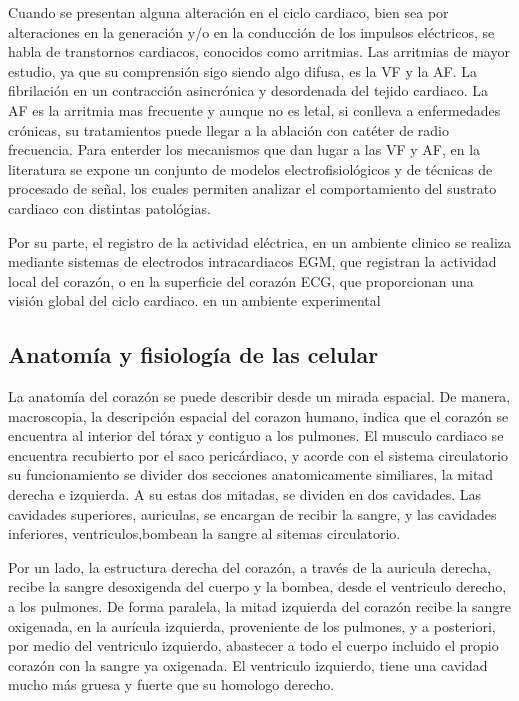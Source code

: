 Cuando se presentan alguna alteración en el ciclo cardiaco, bien sea por
alteraciones en la generación y/o en la conducción de los impulsos eléctricos,
se habla de transtornos cardiacos, conocidos como arritmias. Las arritmias de
mayor estudio, ya que su comprensión sigo siendo algo difusa, es la \acf{VF} y
la \acf{AF}. La fibrilación en un contracción asincrónica y desordenada del
tejido cardiaco. La \ac{AF} es la arritmia mas frecuente y aunque no es letal,
si conlleva a enfermedades crónicas, su tratamientos puede llegar a la ablación
con catéter de radio frecuencia.  Para enterder los mecanismos que dan lugar
a las \ac{VF} y \ac{AF}, en la literatura se expone un conjunto de modelos
electrofisiológicos y de técnicas de procesado de señal, los cuales permiten
analizar el comportamiento del sustrato cardiaco con distintas patológias.


Por su parte, el registro de la actividad eléctrica, en un ambiente clinico se
realiza mediante sistemas de electrodos intracardiacos \ac{EGM}, que registran
la actividad local del corazón, o en la superficie del corazón \ac{ECG}, que
proporcionan una visión global del ciclo cardiaco. en un ambiente experimental




\subsection{Anatomía y fisiología de las celular}

La anatomía del corazón se puede describir desde un  mirada espacial. De manera,
macroscopia, la descripción espacial del corazon humano, indica que el corazón
se encuentra al interior del tórax y contiguo a los pulmones. El musculo
cardiaco se encuentra recubierto por el saco pericárdiaco, y acorde con el
sistema circulatorio su funcionamiento se divider dos secciones anatomicamente similiares, la mitad
derecha e izquierda. A su estas dos mitadas, se dividen en dos cavidades. Las
cavidades superiores, auriculas, se encargan de recibir la sangre, y las
cavidades  inferiores, ventriculos,bombean la sangre al sitemas circulatorio.

Por un lado, la estructura derecha del corazón, a través de la auricula derecha,
recibe la sangre desoxigenda del cuerpo  y la bombea, desde el ventriculo
derecho, a los pulmones. De forma paralela, la mitad izquierda del corazón
recibe la sangre oxigenada, en la aurícula izquierda, proveniente de los
pulmones, y a posteriori, por medio del ventriculo izquierdo, abastecer a todo
el cuerpo incluido el propio corazón con la sangre ya oxigenada.
El ventriculo izquierdo, tiene una cavidad mucho
más gruesa y fuerte que su homologo derecho.

